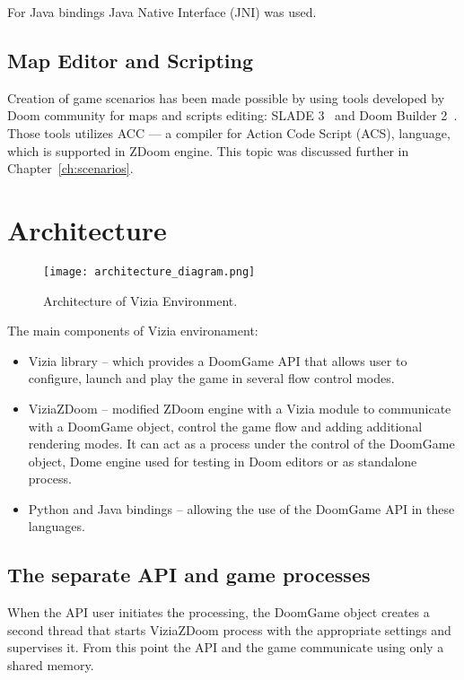 For Java bindings Java Native Interface (JNI) was used.


\subsection{Map Editor and Scripting}

Creation of game scenarios has been made possible by using tools developed by Doom community for maps and scripts editing: SLADE 3~\cite{slade3} and Doom Builder 2~\cite{db2}. Those tools utilizes ACC --- a compiler for Action Code Script (ACS), language, which is supported in ZDoom engine.
This topic was discussed further in Chapter~\ref{ch:scenarios}.

\section{Architecture}\label{sec:architecture}
	\begin{figure}
			\centering
			\texttt{[image: architecture\_diagram.png]}
			\caption{Architecture of Vizia Environment.}\label{fig:architecture_diagram}
	\end{figure}

The main components of Vizia environament:
    \begin{itemize}
    \item Vizia library -- which provides a DoomGame API that allows user to configure, launch and play the game in several flow control modes.
    \item ViziaZDoom -- modified ZDoom engine with a Vizia module to communicate with a DoomGame object, control the game flow and adding additional rendering modes. It can act as a process under the control of the DoomGame object, Dome engine used for testing in Doom editors or as standalone process.
    \item Python and Java bindings -- allowing the use of the DoomGame API in these languages.
    \end{itemize}


\subsection{The separate API and game processes}\label{sec:architecture_separate_processes}

When the API user initiates the processing, the DoomGame object creates a second thread that starts ViziaZDoom process with the appropriate settings and supervises it. From this point the API and the game communicate using only a shared memory.



